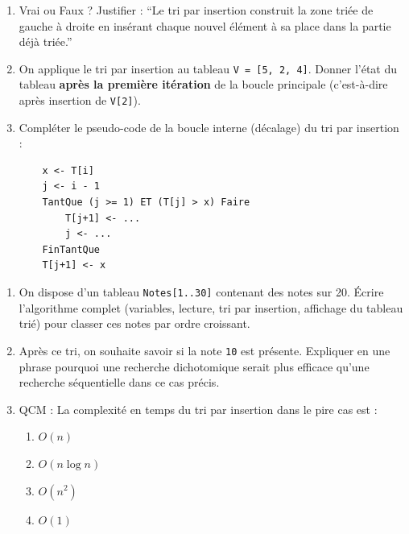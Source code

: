 \documentclass[11pt]{article}
\begin{document}
\begin{exercice}
\begin{enumerate}
    \item Vrai ou Faux ? Justifier : ``Le tri par insertion construit la zone triée de gauche à droite en insérant chaque nouvel élément à sa place dans la partie déjà triée.''
    \item On applique le tri par insertion au tableau \texttt{V = [5, 2, 4]}. Donner l'état du tableau \textbf{après la première itération} de la boucle principale (c'est-à-dire après insertion de \texttt{V[2]}).
    \item Compléter le pseudo-code de la boucle interne (décalage) du tri par insertion :
    \begin{verbatim}
    x <- T[i]
    j <- i - 1
    TantQue (j >= 1) ET (T[j] > x) Faire
        T[j+1] <- ...
        j <- ...
    FinTantQue
    T[j+1] <- x
    \end{verbatim}
\end{enumerate}
\end{exercice}

\begin{exercice}
\begin{enumerate}
    \item On dispose d'un tableau \texttt{Notes[1..30]} contenant des notes sur 20. Écrire l'algorithme complet (variables, lecture, tri par insertion, affichage du tableau trié) pour classer ces notes par ordre croissant.
    \item Après ce tri, on souhaite savoir si la note \texttt{10} est présente. Expliquer en une phrase pourquoi une recherche dichotomique serait plus efficace qu'une recherche séquentielle dans ce cas précis.
    \item QCM : La complexité en temps du tri par insertion dans le pire cas est :
    \begin{enumerate}
        \item $O(n)$
        \item $O(n \log n)$
        \item $O(n^2)$
        \item $O(1)$
    \end{enumerate}
\end{enumerate}
\end{exercice}
\end{document}
